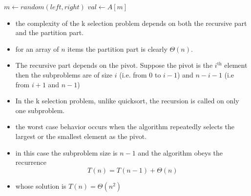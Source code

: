 \documentclass{beamer}
\begin{document}
\begin{frame}
  \begin{function}[H]
 
  \DontPrintSemicolon
  \BlankLine
  $m\gets random(left,right)$\;
  $val\gets A[m]$\;
  \;
 
\end{function}  
\end{frame}
\begin{frame}

\begin{itemize}
	\item the complexity of the k selection problem depends on both the recursive part and the partition part. 
	\item for an array of $n$ items the partition part is clearly $\Theta(n)$.
	\item The recursive part depends on the pivot. Suppose the pivot is the $i^{\text{th}}$ element then the subproblems are of size $i$ (i.e. from 0 to $i-1$) and $n-i-1$ (i.e from $i+1$ and $n-1$)
	\item In the k selection problem, unlike quicksort, the recursion is called on only one subproblem.
	\item the worst case behavior occurs when the algorithm repeatedly selects the largest or the smallest element as the pivot.
	\item in this case the subproblem size is $n-1$ and the algorithm obeys the recurrence
	\begin{displaymath}
		T(n)=T(n-1)+\Theta(n)
	\end{displaymath}
	\item whose solution is $T(n)=\Theta(n^2)$
\end{itemize}	
\end{frame}
\end{document}
